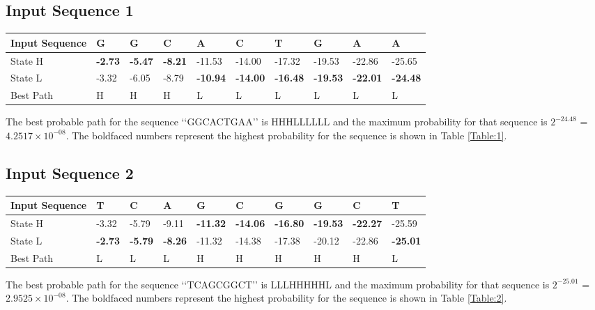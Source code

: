 \documentclass[12pt]{article}
\begin{document}
\subsection{Input Sequence 1} 
\begin{center}
\begin{tabular}{ | m{5em} | m{3em} | m{3em} | m{3em} | m{3em} | m{3em} | m{3em} | m{3em} | m{3em} | m{3em} | }
 \hline
 Input Sequence & G & G & C & A & C & T & G & A & A \\
 \hline
 State H & \textbf{-2.73} & \textbf{-5.47} & \textbf{-8.21} & -11.53 & -14.00 & -17.32 & -19.53 & -22.86 & -25.65  \\
 \hline
 State L & -3.32 & -6.05 & -8.79 & \textbf{-10.94} & \textbf{-14.00} & \textbf{-16.48} & \textbf{-19.53} & \textbf{-22.01} & \textbf{-24.48} \\
 \hline
 Best Path & H & H & H & L & L & L & L & L & L \\
 \hline
\end{tabular}
\label{Table:1}
\end{center}
The best probable path for the sequence \lq\lq{GGCACTGAA}\rq\rq{} is HHHLLLLLL and the maximum probability for that sequence is $2^{-24.48}$ = $4.2517\times10^{-08}$. The boldfaced numbers represent the highest probability for the sequence is shown in Table \ref{Table:1}.

\subsection{Input Sequence 2} 

\begin{center}
\begin{tabular}{ | m{5em} | m{3em} | m{3em} | m{3em} | m{3em} | m{3em} | m{3em} | m{3em} | m{3em} | m{3em} | }
 \hline
 Input Sequence & T & C & A & G & C & G & G & C & T \\
 \hline
 State H & -3.32 & -5.79 & -9.11 & \textbf{-11.32} & \textbf{-14.06} & \textbf{-16.80} & \textbf{-19.53} & \textbf{-22.27} & -25.59  \\
 \hline
 State L & \textbf{-2.73} & \textbf{-5.79} & \textbf{-8.26} & -11.32 & -14.38 & -17.38 & -20.12 & -22.86 & \textbf{-25.01} \\
 \hline
 Best Path & L & L & L & H & H & H & H & H & L \\
 \hline
\end{tabular}
\label{Table:2}
\end{center}
The best probable path for the sequence \lq\lq{TCAGCGGCT}\rq\rq{} is LLLHHHHHL and the maximum probability for that sequence is $2^{-25.01}$ = $2.9525\times10^{-08}$. The boldfaced numbers represent the highest probability for the sequence is shown in Table \ref{Table:2}. 
\end{document}
